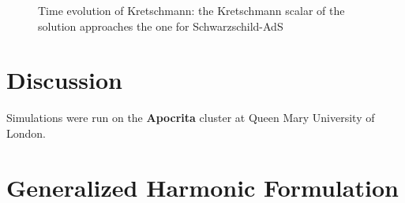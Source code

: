 \documentclass[12pt]{iopart}
\begin{document}
\begin{figure}%
    \centering
    \qquad
    \caption{Time evolution of Kretschmann: the Kretschmann scalar of the solution approaches the one for Schwarzschild-AdS}%
    \label{fig:example}%
\end{figure}




\section{Discussion}\label{sec:Discussion}

\ack
Simulations were run on the {\bf Apocrita} cluster at Queen Mary University of London.

\appendix
\section{Generalized Harmonic Formulation}
\end{document}

